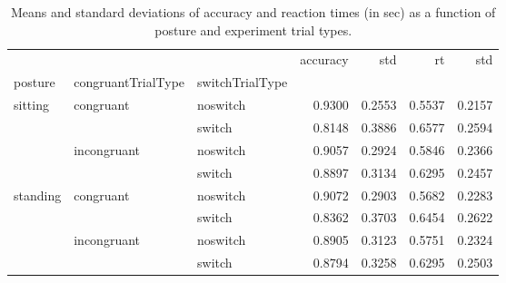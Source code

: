 \begin{table}
\centering
\caption{Means and standard deviations of accuracy and reaction times (in sec) as a function of posture and experiment trial types.}
\label{table-task-switching-replication-reaction-time}
\begin{tabular}{lllrrrr}
\toprule
         &             &        & accuracy &    std &     rt &    std \\
posture & congruantTrialType & switchTrialType &          &        &        &        \\
\midrule
sitting & congruant & noswitch &   0.9300 & 0.2553 & 0.5537 & 0.2157 \\
         &             & switch &   0.8148 & 0.3886 & 0.6577 & 0.2594 \\
         & incongruant & noswitch &   0.9057 & 0.2924 & 0.5846 & 0.2366 \\
         &             & switch &   0.8897 & 0.3134 & 0.6295 & 0.2457 \\
standing & congruant & noswitch &   0.9072 & 0.2903 & 0.5682 & 0.2283 \\
         &             & switch &   0.8362 & 0.3703 & 0.6454 & 0.2622 \\
         & incongruant & noswitch &   0.8905 & 0.3123 & 0.5751 & 0.2324 \\
         &             & switch &   0.8794 & 0.3258 & 0.6295 & 0.2503 \\
\bottomrule
\end{tabular}
\end{table}
